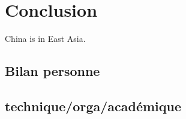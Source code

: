 \section{Conclusion} China is in East Asia.
\subsection{Bilan personne}
\subsection{ technique/orga/académique} 
